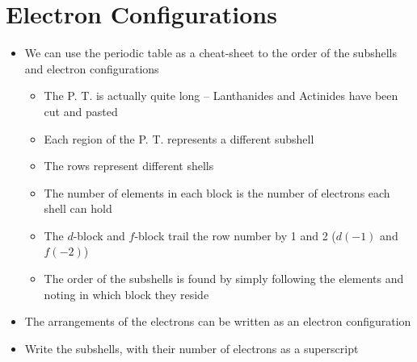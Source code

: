 \documentclass[12pt, openany, letterpaper]{memoir}
\begin{document}
\section{Electron Configurations}
\begin{itemize}
	\item We can use the periodic table as a cheat-sheet to the order of the subshells and electron configurations
	      \begin{itemize}
		      \item The P. T. is actually quite long -- Lanthanides and Actinides have been cut and pasted
		      \item Each region of the P. T. represents a different subshell
		      \item The rows represent different shells
		      \item The number of elements in each block is the number of electrons each shell can hold
		      \item The $d$-block and $f$-block trail the row number by 1 and 2 ($d(-1)$ and $f(-2)$)
		      \item The order of the subshells is found by simply following the elements and noting in which block they reside
	      \end{itemize}
	\item The arrangements of the electrons can be written as an electron configuration
	\item Write the subshells, with their number of electrons as a superscript


\end{itemize}
\end{document}
